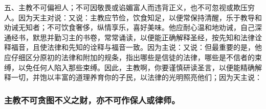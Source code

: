 五、主教不可偏袒人；不可因敬畏或谄媚富人而违背正义，也不可忽视或欺压穷人。因为天主对说：又说：主教应节俭，饮食知足，以便常保持清醒，乐于教导和劝诫无知者；不可饮食奢侈，纵情享乐，喜好美味。他应耐心温和地劝诫，自己深通经书，默思并勤习主的书卷，常常诵读，以便能正确解释圣经，按先知和法律诠释福音，且使法律和先知的诠释与福音一致。因为主说：又说：但最重要的是，他应仔细区分原初的法律和附加的规条，指出哪些是信徒的法律，哪些是不信者的束缚，以免任何人陷入那些束缚。因此，主教啊，你要谨慎研读圣言，以便能精确解释一切，并饱以丰富的道理养育你的子民，以法律的光明照亮他们；因为天主说：\par


\subsubsection{主教不可贪图不义之财，亦不可作保人或律师。}

